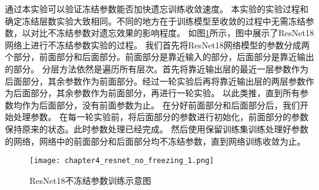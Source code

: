 通过本实验可以验证冻结参数能否加快遗忘训练收敛速度。
本实验的实验过程和确定冻结层数实验大致相同。不同的地方在于训练模型至收敛的过程中无需冻结参数，以对比不冻结参数对遗忘效果的影响程度。
如图\ref{fig:chapter4_resnet_no_freezing_1}所示，图中展示了ResNet18网络上进行不冻结参数实验的过程。
我们首先将ResNet18网络模型的参数分成两个部分，前面部分和后面部分。前面部分是靠近输入的部分，后面部分是靠近输出的部分。
分层方法依然是遍历所有层次。首先将靠近输出层的最近一层参数作为后面部分，其余参数作为前面部分。经过一轮实验后再将靠近输出层的两层参数作为后面部分，其余参数作为前面部分，再进行一轮实验。
以此类推，直到所有参数均作为后面部分，没有前面参数为止。
在分好前面部分和后面部分后，我们开始处理参数。
在每一轮实验前，将后面部分的参数进行初始化，前面部分的参数保持原来的状态。此时参数处理已经完成。
然后使用保留训练集训练处理好参数的网络，网络中的前面部分和后面部分均不冻结参数，直到网络训练收敛为止。
\begin{figure}
    \centering
    \texttt{[image: chapter4\_resnet\_no\_freezing\_1.png]}
    \caption{ResNet18不冻结参数训练示意图}
    \label{fig:chapter4_resnet_no_freezing_1}
\end{figure}


